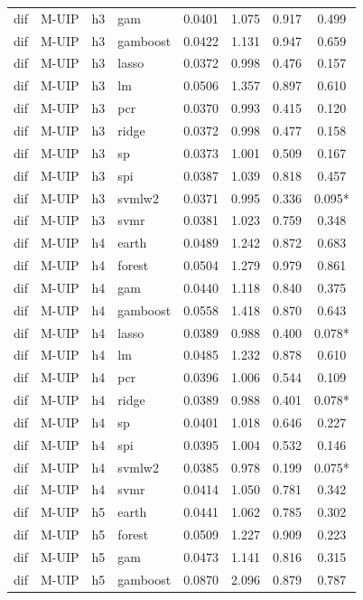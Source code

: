 \begin{ThreePartTable}
\begin{longtable}[t]{llclcccc}
dif & M-UIP & h3 & gam & 0.0401 & 1.075 & 0.917 & 0.499\\
dif & M-UIP & h3 & gamboost & 0.0422 & 1.131 & 0.947 & 0.659\\
dif & M-UIP & h3 & lasso & 0.0372 & 0.998 & 0.476 & 0.157\\
dif & M-UIP & h3 & lm & 0.0506 & 1.357 & 0.897 & 0.610\\
dif & M-UIP & h3 & pcr & 0.0370 & 0.993 & 0.415 & 0.120\\
dif & M-UIP & h3 & ridge & 0.0372 & 0.998 & 0.477 & 0.158\\
dif & M-UIP & h3 & sp & 0.0373 & 1.001 & 0.509 & 0.167\\
dif & M-UIP & h3 & spi & 0.0387 & 1.039 & 0.818 & 0.457\\
dif & M-UIP & h3 & svmlw2 & 0.0371 & 0.995 & 0.336 & 0.095*\\
dif & M-UIP & h3 & svmr & 0.0381 & 1.023 & 0.759 & 0.348\\
\addlinespace
dif & M-UIP & h4 & earth & 0.0489 & 1.242 & 0.872 & 0.683\\
dif & M-UIP & h4 & forest & 0.0504 & 1.279 & 0.979 & 0.861\\
dif & M-UIP & h4 & gam & 0.0440 & 1.118 & 0.840 & 0.375\\
dif & M-UIP & h4 & gamboost & 0.0558 & 1.418 & 0.870 & 0.643\\
dif & M-UIP & h4 & lasso & 0.0389 & 0.988 & 0.400 & 0.078*\\
dif & M-UIP & h4 & lm & 0.0485 & 1.232 & 0.878 & 0.610\\
dif & M-UIP & h4 & pcr & 0.0396 & 1.006 & 0.544 & 0.109\\
dif & M-UIP & h4 & ridge & 0.0389 & 0.988 & 0.401 & 0.078*\\
dif & M-UIP & h4 & sp & 0.0401 & 1.018 & 0.646 & 0.227\\
dif & M-UIP & h4 & spi & 0.0395 & 1.004 & 0.532 & 0.146\\
dif & M-UIP & h4 & svmlw2 & 0.0385 & 0.978 & 0.199 & 0.075*\\
dif & M-UIP & h4 & svmr & 0.0414 & 1.050 & 0.781 & 0.342\\
\addlinespace
dif & M-UIP & h5 & earth & 0.0441 & 1.062 & 0.785 & 0.302\\
dif & M-UIP & h5 & forest & 0.0509 & 1.227 & 0.909 & 0.223\\
dif & M-UIP & h5 & gam & 0.0473 & 1.141 & 0.816 & 0.315\\
dif & M-UIP & h5 & gamboost & 0.0870 & 2.096 & 0.879 & 0.787\\

\end{longtable}
\end{ThreePartTable}

